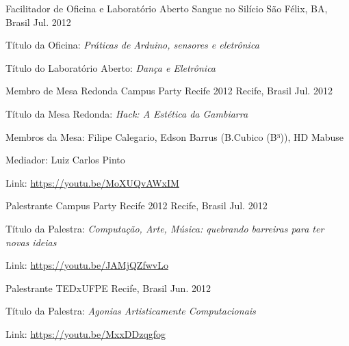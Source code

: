 \begin{cventries}
\cventry
	{Facilitador de Oficina e Laboratório Aberto}
	{Sangue no Silício}
	{São Félix, BA, Brasil}
	{Jul. 2012}
	{\begin{cvitems}
		\item{Título da Oficina: \textit{Práticas de Arduino, sensores e eletrônica}}
		\item{Título do Laboratório Aberto: \textit{Dança e Eletrônica}}
	\end{cvitems}}

\cventry
	{Membro de Mesa Redonda}
	{Campus Party Recife 2012}
	{Recife, Brasil}
	{Jul. 2012}
	{\begin{cvitems}
		\item{Título da Mesa Redonda: \textit{Hack: A Estética da Gambiarra}}
		\item{Membros da Mesa: Filipe Calegario, Edson Barrus (B.Cubico (B³)), HD Mabuse}
		\item{Mediador: Luiz Carlos Pinto}
		\item{Link: \href{https://youtu.be/MoXUQvAWxIM}{https://youtu.be/MoXUQvAWxIM}}
	\end{cvitems}}

\cventry
	{Palestrante}
	{Campus Party Recife 2012}
	{Recife, Brasil}
	{Jul. 2012}
	{\begin{cvitems}
		\item{Título da Palestra: \textit{Computação, Arte, Música: quebrando barreiras para ter novas ideias}}
		\item{Link: \href{https://youtu.be/JAMjQZfwvLo}{https://youtu.be/JAMjQZfwvLo}}
	\end{cvitems}}

\cventry
	{Palestrante}
	{TEDxUFPE}
	{Recife, Brasil}
	{Jun. 2012}
	{\begin{cvitems}
		\item{Título da Palestra: \textit{Agonias Artisticamente Computacionais}}
		\item{Link: \href{https://youtu.be/MxxDDzqgfog}{https://youtu.be/MxxDDzqgfog}}
	\end{cvitems}}


\end{cventries}
